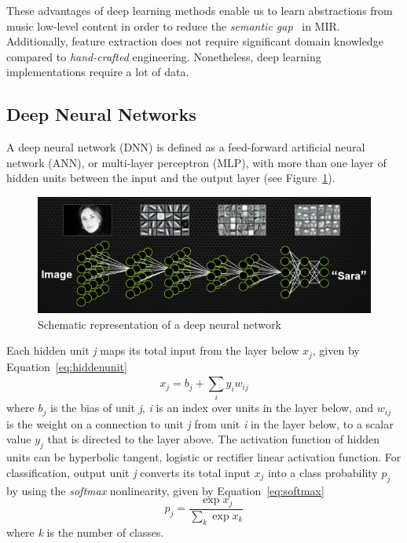 These advantages of deep learning methods enable us to learn abstractions from music low-level content in order to reduce the \textit{semantic gap}~\parencite{Celma2006} in MIR. Additionally, feature extraction does not require significant domain knowledge compared to \textit{hand-crafted} engineering. Nonetheless, deep learning implementations require a lot of data.

\subsection{Deep Neural Networks}
A deep neural network (DNN) \parencite{hinton2012deep} is defined as a feed-forward artificial neural network (ANN), or multi-layer perceptron (MLP), with more than one layer of hidden units between the input and the output layer (see Figure~\ref{fig:dnn}).
\begin{figure}[ht!]
	\centering
	\includegraphics[width=\textwidth]{chapter2/dnn.png}
	\caption{Schematic representation of a deep neural network~\parencite{1_brown_2014}}
	\label{fig:dnn}
\end{figure}

Each hidden unit \emph{j} maps its total input from the layer below $x_j$, given by Equation~\eqref{eq:hiddenunit} 
\begin{equation}
x_j =b_j+\sum_{i}^{}y_iw_{ij}
\label{eq:hiddenunit}
\end{equation}
where $b_j$ is the bias of unit \emph{j}, \emph{i} is an index over units in the
layer below, and $w_{ij}$ is the weight on a connection to unit \emph{j}
from unit \emph{i} in the layer below, to a scalar value $y_j$ that is directed to the layer above. The activation function of hidden units can be hyperbolic tangent, logistic or rectifier linear activation function. For classification, output unit \emph{j} converts its total input $x_j$ into a class probability $p_j$ by using the \textit{softmax} nonlinearity, given by Equation~\eqref{eq:softmax}
\begin{equation}
p_j =\frac{\exp x_j}{\sum_{k}^{}\exp x_k}
\label{eq:softmax}
\end{equation}
where \emph{k} is the number of classes.
